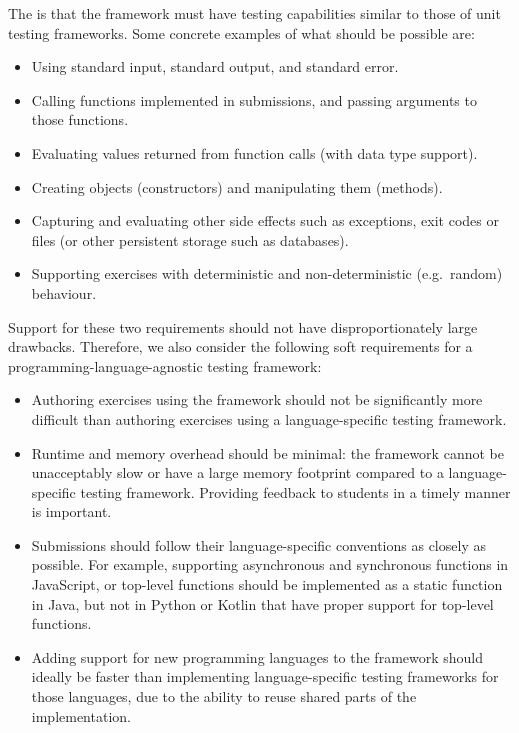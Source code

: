 \documentclass[../main]{subfiles}
\begin{document}
The  is that the framework must have testing capabilities similar to those of unit testing frameworks.
Some concrete examples of what should be possible are:

\begin{itemize}
    \item Using standard input, standard output, and standard error.
    \item Calling functions implemented in submissions, and passing arguments to those functions.
    \item Evaluating values returned from function calls (with data type support).
    \item Creating objects (constructors) and manipulating them (methods).
    \item Capturing and evaluating other side effects such as exceptions, exit codes or files (or other persistent storage such as databases).
    \item Supporting exercises with deterministic and non-deterministic (e.g.\ random) behaviour.
\end{itemize}

Support for these two requirements should not have disproportionately large drawbacks.
Therefore, we also consider the following soft requirements for a programming-language-agnostic testing framework:

\begin{itemize}
    \item Authoring exercises using the framework should not be significantly more difficult than authoring exercises using a language-specific testing framework.
    \item Runtime and memory overhead should be minimal: the framework cannot be unacceptably slow or have a large memory footprint compared to a language-specific testing framework.
        Providing feedback to students in a timely manner is important.
    \item Submissions should follow their language-specific conventions as closely as possible.
        For example, supporting asynchronous and synchronous functions in JavaScript, or top-level functions should be implemented as a static function in Java, but not in Python or Kotlin that have proper support for top-level functions.
    \item Adding support for new programming languages to the framework should ideally be faster than implementing language-specific testing frameworks for those languages, due to the ability to reuse shared parts of the implementation.
\end{itemize}
\end{document}
